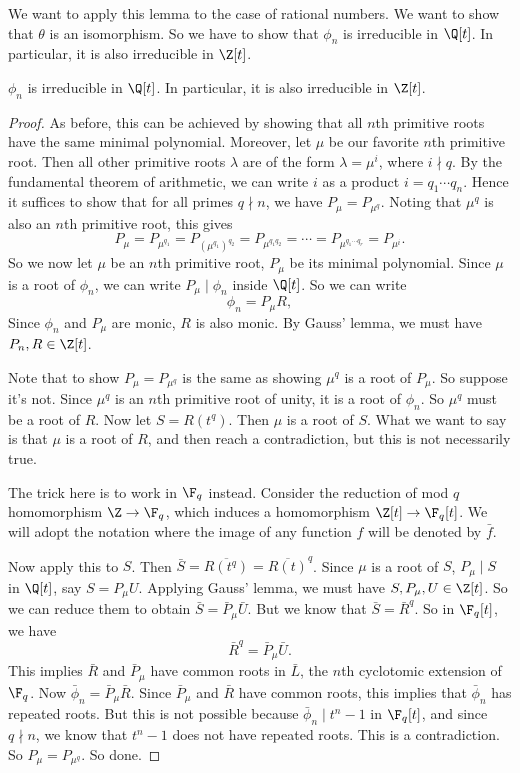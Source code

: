 \documentclass[a4paper]{article}
\begin{document}
We want to apply this lemma to the case of rational numbers. We want to show that $\theta$ is an isomorphism. So we have to show that $\phi_n$ is irreducible in $\Q[t]$. In particular, it is also irreducible in $\Z[t]$.
\begin{thm}
  $\phi_n$ is irreducible in $\Q[t]$. In particular, it is also irreducible in $\Z[t]$.
\end{thm}

\begin{proof}
  As before, this can be achieved by showing that all $n$th primitive roots have the same minimal polynomial. Moreover, let $\mu$ be our favorite $n$th primitive root. Then all other primitive roots $\lambda$ are of the form $\lambda = \mu^i$, where $i \nmid q$. By the fundamental theorem of arithmetic, we can write $i$ as a product $i = q_1 \cdots q_n$. Hence it suffices to show that for all primes $q \nmid n$, we have $P_{\mu} = P_{\mu^q}$. Noting that $\mu^q$ is also an $n$th primitive root, this gives
  \[
    P_{\mu} = P_{\mu^{q_1}} = P_{(\mu^{q_1})^{q_2}} = P_{\mu^{q_1q_2}} = \cdots = P_{\mu^{q_1\cdots q_r}} = P_{\mu^i}.
  \]
  So we now let $\mu$ be an $n$th primitive root, $P_\mu$ be its minimal polynomial. Since $\mu$ is a root of $\phi_n$, we can write $P_\mu \mid \phi_n$ inside $\Q[t]$. So we can write
  \[
    \phi_n = P_\mu R,
  \]
  Since $\phi_n$ and $P_\mu$ are monic, $R$ is also monic. By Gauss' lemma, we must have $P_n, R \in \Z[t]$.

  Note that to show $P_\mu = P_{\mu^q}$ is the same as showing $\mu^q$ is a root of $P_\mu$. So suppose it's not. Since $\mu^q$ is an $n$th primitive root of unity, it is a root of $\phi_n$. So $\mu^q$ must be a root of $R$. Now let $S = R(t^q)$. Then $\mu$ is a root of $S$. What we want to say is that $\mu$ is a root of $R$, and then reach a contradiction, but this is not necessarily true.

  The trick here is to work in $\F_q$ instead. Consider the reduction of mod $q$ homomorphism $\Z \to \F_q$, which induces a homomorphism $\Z[t] \to \F_q[t]$. We will adopt the notation where the image of any function $f$ will be denoted by $\bar{f}$.

  Now apply this to $S$. Then $\bar{S} = \overline{R(t^q)} = \overline{R(t)}^q$. Since $\mu$ is a root of $S$, $P_\mu \mid S$ in $\Q[t]$, say $S = P_\mu U$. Applying Gauss' lemma, we must have $S, P_\mu, U \in \Z[t]$. So we can reduce them to obtain $\bar{S} = \bar{P}_\mu \bar{U}$. But we know that $\bar{S} = \bar{R}^q$. So in $\F_q[t]$, we have
  \[
    \bar{R}^q = \bar{P}_\mu \bar{U}.
  \]
  This implies $\bar{R}$ and $\bar{P}_\mu$ have common roots in $\bar{L}$, the $n$th cyclotomic extension of $\F_q$. Now $\bar{\phi}_n = \bar{P}_\mu \bar{R}$. Since $\bar{P}_\mu$ and $\bar{R}$ have common roots, this implies that $\bar{\phi}_n$ has repeated roots. But this is not possible because $\bar{\phi}_n \mid t^{n} - 1$ in $\F_q[t]$, and since $q\nmid n$, we know that $t^{n} - 1$ does not have repeated roots. This is a contradiction. So $P_\mu = P_{\mu^q}$. So done.
\end{proof}
\end{document}
